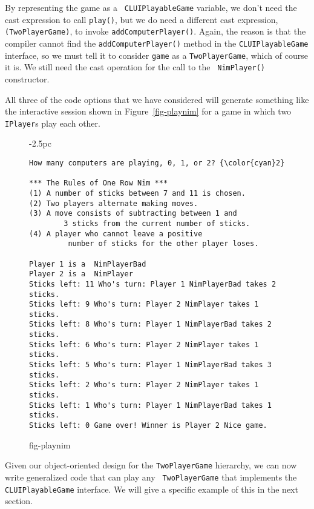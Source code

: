 \noindent By representing the game as a {\tt
CLUIPlayableGame} variable, we don't need the cast expression to call
{\tt play()}, but we do need a different cast expression, {\tt
(TwoPlayerGame)}, to invoke {\tt addComputerPlayer()}.  Again, the
reason is that the compiler cannot find the {\tt add\-Computer\-Player()}
method in the {\tt CLUIPlayableGame} interface, so we must tell it to
consider {\tt game} as a {\tt TwoPlayerGame}, which of course it
is. We still need the cast operation for the call to the {\tt
NimPlayer()} constructor.

All three of the code options that we have considered will generate
something like the interactive session shown in
Figure~\ref{fig-playnim} for a game in which two {\tt IPlayer}s play
each other.


\begin{figure}[h]
\jjjprogstart
\begin{jjjlistingleft}[28.5pc]{-2.5pc}
\begin{lstlisting}[stringstyle=\color{black}]
How many computers are playing, 0, 1, or 2? {\color{cyan}2}

*** The Rules of One Row Nim ***
(1) A number of sticks between 7 and 11 is chosen.
(2) Two players alternate making moves.
(3) A move consists of subtracting between 1 and
        3 sticks from the current number of sticks.
(4) A player who cannot leave a positive
         number of sticks for the other player loses.

Player 1 is a  NimPlayerBad
Player 2 is a  NimPlayer
Sticks left: 11 Who's turn: Player 1 NimPlayerBad takes 2 sticks.
Sticks left: 9 Who's turn: Player 2 NimPlayer takes 1 sticks.
Sticks left: 8 Who's turn: Player 1 NimPlayerBad takes 2 sticks.
Sticks left: 6 Who's turn: Player 2 NimPlayer takes 1 sticks.
Sticks left: 5 Who's turn: Player 1 NimPlayerBad takes 3 sticks.
Sticks left: 2 Who's turn: Player 2 NimPlayer takes 1 sticks.
Sticks left: 1 Who's turn: Player 1 NimPlayerBad takes 1 sticks.
Sticks left: 0 Game over! Winner is Player 2 Nice game.
\end{lstlisting}
\end{jjjlistingleft}
{fig-playnim}
\end{figure}

Given our object-oriented design for the {\tt TwoPlayerGame}
hierarchy, we can now write generalized code that can play any {\tt
TwoPlayerGame} that implements the {\tt CLUIPlayableGame}
interface. We will give a specific example of this in the next
section.

